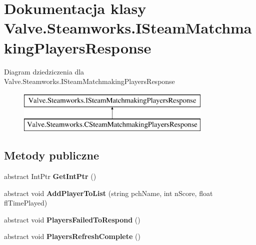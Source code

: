 \hypertarget{class_valve_1_1_steamworks_1_1_i_steam_matchmaking_players_response}{}\section{Dokumentacja klasy Valve.\+Steamworks.\+I\+Steam\+Matchmaking\+Players\+Response}
\label{class_valve_1_1_steamworks_1_1_i_steam_matchmaking_players_response}
Diagram dziedziczenia dla Valve.\+Steamworks.\+I\+Steam\+Matchmaking\+Players\+Response\begin{figure}[H]
\begin{center}
\leavevmode
\includegraphics[height=2.000000cm]{class_valve_1_1_steamworks_1_1_i_steam_matchmaking_players_response}
\end{center}
\end{figure}
\subsection*{Metody publiczne}
\begin{DoxyCompactItemize}
\item 
\mbox{\label{class_valve_1_1_steamworks_1_1_i_steam_matchmaking_players_response_aa29845c7a687f3603f659a81af390b6d}} 
abstract Int\+Ptr {\bfseries Get\+Int\+Ptr} ()
\item 
\mbox{\label{class_valve_1_1_steamworks_1_1_i_steam_matchmaking_players_response_a3e67bda2e749340baa6dc118a3b689bc}} 
abstract void {\bfseries Add\+Player\+To\+List} (string pch\+Name, int n\+Score, float fl\+Time\+Played)
\item 
\mbox{\label{class_valve_1_1_steamworks_1_1_i_steam_matchmaking_players_response_add19cd1ade81c93b1e2574cfd6617daf}} 
abstract void {\bfseries Players\+Failed\+To\+Respond} ()
\item 
\mbox{\label{class_valve_1_1_steamworks_1_1_i_steam_matchmaking_players_response_afcb8cc9746e9ca474a9b3db561788b9d}} 
abstract void {\bfseries Players\+Refresh\+Complete} ()
\end{DoxyCompactItemize}



